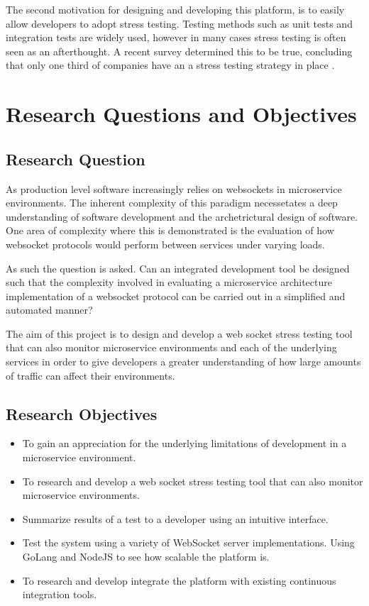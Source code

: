 The second motivation for designing and developing this platform, is to easily allow developers to adopt stress testing. Testing methods such as unit tests and integration tests are widely used, however in many cases stress testing is often seen as an afterthought. A recent survey determined this to be true, concluding that only one third of companies have an a stress testing strategy in place \cite{bezemer2019performance}.

\section{Research Questions and Objectives}

\subsection{Research Question}

As production level software increasingly relies on websockets in microservice environments. The inherent complexity of this paradigm necessetates a deep understanding of software development and the archetrictural design of software. One area of complexity where this is demonstrated is the evaluation of how websocket protocols would perform between services under varying loads. 

As such the question is asked. Can an integrated development tool be designed such that the complexity involved in evaluating a microservice architecture implementation of a websocket protocol can be carried out in a simplified and automated manner?

The aim of this project is to design and develop a web socket stress testing tool that can also monitor microservice environments and each of the underlying services in order to give developers a greater understanding of how large amounts of traffic can affect their environments.

\subsection{Research Objectives}

\begin{itemize}
  \item To gain an appreciation for the underlying limitations of development in a microservice environment.
  \item To research and develop a web socket stress testing tool that can also monitor microservice environments.
  \item Summarize results of a test to a developer using an intuitive interface.
  \item Test the system using a variety of WebSocket server implementations. Using GoLang and NodeJS to see how scalable the platform is.
  \item To research and develop integrate the platform with existing continuous integration tools.
\end{itemize}

